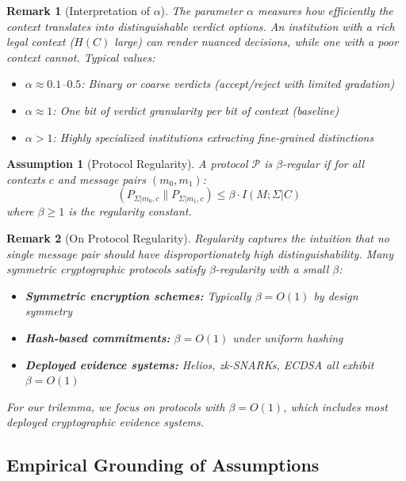 \documentclass{ieeeaccess}
\DeclareMathOperator{\KL}{D_{\text{KL}}}
\newtheorem{remark}{Remark}[subsection]
\newtheorem{assumption}{Assumption}[subsection]
\begin{document}
\begin{remark}[Interpretation of $\alpha$]
The parameter $\alpha$ measures how efficiently the context translates into distinguishable verdict options. An institution with a rich legal context ($H(C)$ large) can render nuanced decisions, while one with a poor context cannot. Typical values:
\begin{itemize}
\item $\alpha \approx 0.1$--$0.5$: Binary or coarse verdicts (accept/reject with limited gradation)
\item $\alpha \approx 1$: One bit of verdict granularity per bit of context (baseline)
\item $\alpha > 1$: Highly specialized institutions extracting fine-grained distinctions
\end{itemize}
\end{remark}

\begin{assumption}[Protocol Regularity]\label{ass:regularity}
A protocol $\mathcal{P}$ is $\beta$-regular if for all contexts $c$ and message pairs $(m_0, m_1)$:
\begin{equation}
\KL(P_{\Sigma|m_0,c} \| P_{\Sigma|m_1,c}) \leq \beta \cdot I(M;\Sigma|C)
\end{equation}
where $\beta \geq 1$ is the regularity constant.
\end{assumption}

\begin{remark}[On Protocol Regularity]\label{rem:regularity}
Regularity captures the intuition that no single message pair should have disproportionately high distinguishability. Many symmetric cryptographic protocols satisfy $\beta$-regularity with a small $\beta$:
\begin{itemize}
\item \textbf{Symmetric encryption schemes:} Typically $\beta = O(1)$ by design symmetry
\item \textbf{Hash-based commitments:} $\beta = O(1)$ under uniform hashing
\item \textbf{Deployed evidence systems:} Helios, zk-SNARKs, ECDSA all exhibit $\beta = O(1)$
\end{itemize}
For our trilemma, we focus on protocols with $\beta = O(1)$, which includes most deployed cryptographic evidence systems.
\end{remark}

\subsection{Empirical Grounding of Assumptions}\label{subsec:empirical_grounding}
\end{document}

